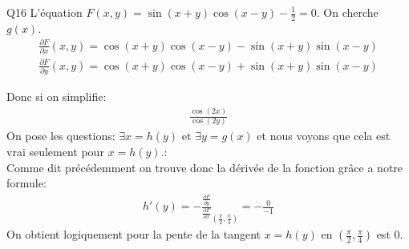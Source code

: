 \begin{parag}{Q16}
    L'équation $F\left(x, y\right) = \sin\left(x + y\right)\cos\left(x-y\right) - \frac{1}{2} = 0$. On cherche $g\left(x\right)$.\\
\begin{align*} \frac{\partial F}{\partial x}\left(x, y\right) = \cos\left(x + y\right)\cos\left(x-y\right) - \sin\left(x + y\right)\sin\left(x-y\right) \end{align*}
\begin{align*} \frac{\partial F}{\partial y}\left(x, y\right) = \cos\left(x + y\right)\cos\left(x-y\right) + \sin\left(x+y\right)\sin\left(x-y\right) \end{align*}

Donc si on simplifie:
\begin{align*} \frac{\cos\left(2x\right)}{\cos\left(2y\right)} \end{align*}
    On pose les questions: $\exists x =  h\left(y\right)$ et $\exists y =  g\left(x\right)$ et nous voyons que cela est vrai seulement pour $x = h\left(y\right)$.:\\
Comme dit précédemment on trouve donc la dérivée de la fonction grâce a notre formule:
\begin{align*} h'\left(y\right) = - \frac{\frac{\partial F}{\partial y}}{\frac{\partial F}{\partial x}}_{\left(\frac{\pi}{2}, \frac{\pi}{4}\right)} = -\frac{0}{-1}\end{align*}
On obtient logiquement pour la pente de la tangent $x =  h\left(y\right)$ en $\left(\frac{\pi}{2}, \frac{\pi}{4}\right)$ est $0$.

\end{parag}



